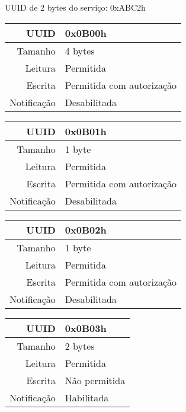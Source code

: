 \begin{tcolorbox}[arc=3mm,fontupper=\small,fonttitle=\bfseries,
subtitle style={boxrule=0.4pt, colback=white},colframe=green!25!black,
halign=center,bottom=0mm,
title=Temperature and Humidity Sensor Service]
	UUID de 2 bytes do serviço: 0xABC2h
	
	\begin{tcbitemize}[raster columns=2,raster equal height,fontupper=\footnotesize,
	colbacktitle=yellow!100!red!100!black, coltitle=black,
	fonttitle=\footnotesize\bfseries,size=small, halign=center]
	
	\tcbitem [squeezed title={Sensing Interval Characteristic}]
		\begin{tabular}{ r | l }
		UUID & 0x0B00h \\ \hline
		Tamanho & 4 bytes \\ \hline
		Leitura & Permitida \\ \hline
		Escrita & Permitida com autorização \\ \hline
		Notificação & Desabilitada 
		\end{tabular}

		\tcbitem [squeezed title={Sensor Status Characteristic}]
		\begin{tabular}{ r | l }
		UUID & 0x0B01h \\ \hline
		Tamanho & 1 byte \\ \hline
		Leitura & Permitida \\ \hline
		Escrita & Permitida com autorização \\ \hline
		Notificação & Desabilitada 
		\end{tabular}
		
		\tcbitem [squeezed title={Sensor Resolution Characteristic}]
		\begin{tabular}{ r | l }
		UUID & 0x0B02h \\ \hline
		Tamanho & 1 byte \\ \hline
		Leitura & Permitida \\ \hline
		Escrita & Permitida com autorização \\ \hline
		Notificação & Desabilitada 
		\end{tabular}

		\tcbitem [squeezed title={Temperature Data Characteristic}]
		\begin{tabular}{ r | l }
		UUID & 0x0B03h \\ \hline
		Tamanho & 2 bytes \\ \hline
		Leitura & Permitida \\ \hline
		Escrita & Não permitida \\ \hline
		Notificação & Habilitada 
		\end{tabular}
		

\end{tcbitemize}
\end{tcolorbox}

